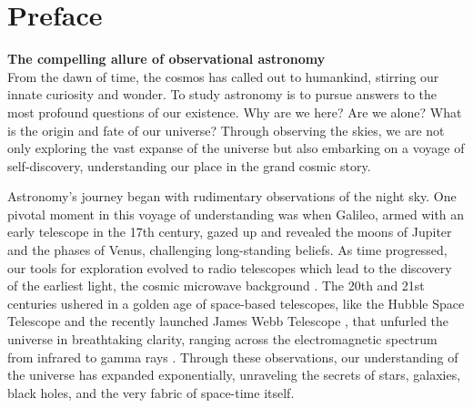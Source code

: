 \chapter{Preface}

{\large{\textbf{The compelling allure of observational astronomy}}}\\



From the dawn of time, the cosmos has called out to humankind, stirring our innate curiosity and wonder. To study astronomy is to pursue answers to the most profound questions of our existence. Why are we here? Are we alone? What is the origin and fate of our universe? Through observing the skies, we are not only exploring the vast expanse of the universe but also embarking on a voyage of self-discovery, understanding our place in the grand cosmic story.

Astronomy's journey began with rudimentary observations of the night sky. One pivotal moment in this voyage of understanding was when Galileo, armed with an early telescope in the 17th century, gazed up and revealed the moons of Jupiter and the phases of Venus, challenging long-standing beliefs. As time progressed, our tools for exploration evolved to radio telescopes which lead to the discovery of the earliest light, the cosmic microwave background \cite{Penzias:1965wn}. The 20th and 21st centuries ushered in a golden age of space-based telescopes, like the Hubble Space Telescope \cite{Windhorst:2010ib} and the recently launched James Webb Telescope \cite{Gardner:2006ky}, that unfurled the universe in breathtaking clarity, ranging across the electromagnetic spectrum from infrared to gamma rays \cite{infrared-James,Klebesadel:1973iq}. Through these observations, our understanding of the universe has expanded exponentially, unraveling the secrets of stars, galaxies, black holes, and the very fabric of space-time itself.

